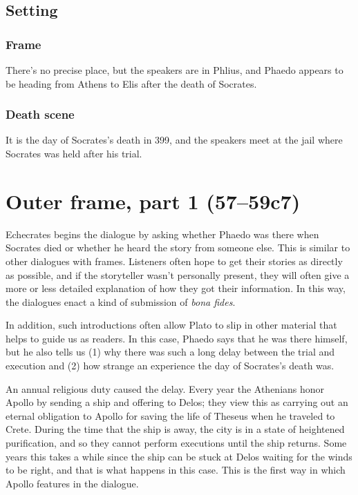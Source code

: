 \documentclass[12pt,letterpaper]{article}
\begin{document}

\subsection{Setting}

\subsubsection{Frame}

There's no precise place, but the speakers are in Phlius, and Phaedo appears to be heading from Athens to Elis after the death of Socrates.

\subsubsection{Death scene}

It is the day of Socrates's death in 399, and the speakers meet at the jail where Socrates was held after his trial.



\section{Outer frame, part 1 (57--59c7)}

Echecrates begins the dialogue by asking whether Phaedo was there when Socrates died or whether he heard the story from someone else. This is similar to other dialogues with frames. Listeners often hope to get their stories as directly as possible, and if the storyteller wasn't personally present, they will often give a more or less detailed explanation of how they got their information. In this way, the dialogues enact a kind of submission of \textit{bona fides}.

In addition, such introductions often allow Plato to slip in other material that helps to guide us as readers. In this case, Phaedo says that he was there himself, but he also tells us (1) why there was such a long delay between the trial and execution and (2) how strange an experience the day of Socrates's death was.

An annual religious duty caused the delay. Every year the Athenians honor Apollo by sending a ship and offering to Delos; they view this as carrying out an eternal obligation to Apollo for saving the life of Theseus when he traveled to Crete. During the time that the ship is away, the city is in a state of heightened purification, and so they cannot perform executions until the ship returns. Some years this takes a while since the ship can be stuck at Delos waiting for the winds to be right, and that is what happens in this case. This is the first way in which Apollo features in the dialogue.
\end{document}
